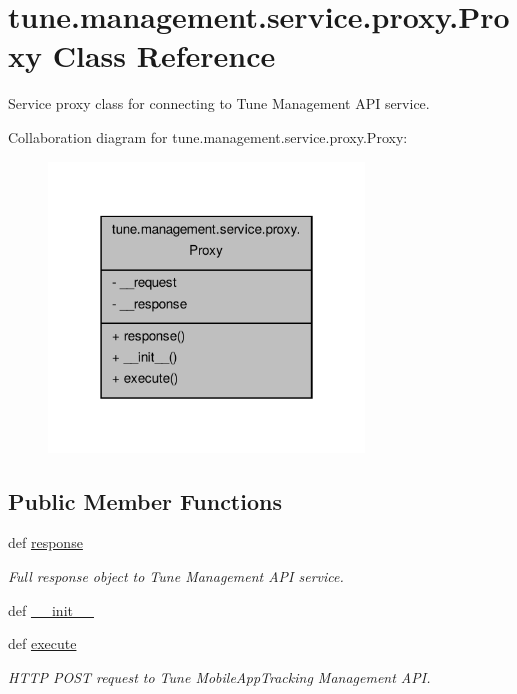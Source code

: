 \hypertarget{classtune_1_1management_1_1service_1_1proxy_1_1Proxy}{\section{tune.\-management.\-service.\-proxy.\-Proxy Class Reference}
\label{classtune_1_1management_1_1service_1_1proxy_1_1Proxy}
}


Service proxy class for connecting to Tune Management A\-P\-I service.  




Collaboration diagram for tune.\-management.\-service.\-proxy.\-Proxy\-:
\nopagebreak
\begin{figure}[H]
\begin{center}
\leavevmode
\includegraphics[width=238pt]{classtune_1_1management_1_1service_1_1proxy_1_1Proxy__coll__graph}
\end{center}
\end{figure}
\subsection*{Public Member Functions}
\begin{DoxyCompactItemize}
\item 
def \hyperlink{classtune_1_1management_1_1service_1_1proxy_1_1Proxy_a0b3f63ff9936b0857c4ae47b38b5f926}{response}
\begin{DoxyCompactList}\small\item\em Full response object to Tune Management A\-P\-I service. \end{DoxyCompactList}\item 
def \hyperlink{classtune_1_1management_1_1service_1_1proxy_1_1Proxy_a8fe235be39f55c27191277d95d7ef25f}{\-\_\-\-\_\-init\-\_\-\-\_\-}
\item 
def \hyperlink{classtune_1_1management_1_1service_1_1proxy_1_1Proxy_af3c0cf7d72b8b929b0e5fbbd1611c7ef}{execute}
\begin{DoxyCompactList}\small\item\em H\-T\-T\-P P\-O\-S\-T request to Tune Mobile\-App\-Tracking Management A\-P\-I. \end{DoxyCompactList}\end{DoxyCompactItemize}
